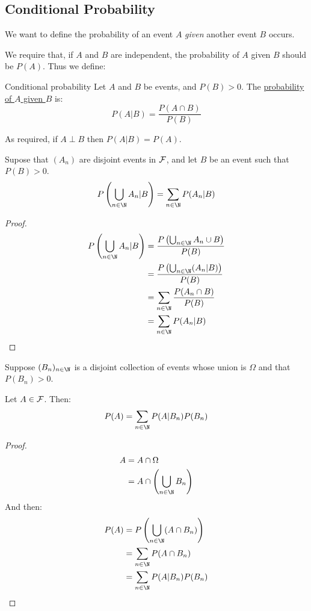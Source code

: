 \documentclass[../Main.tex]{subfiles}
\begin{document}
\subsection{Conditional Probability}
We want to define the probability of an event $A$ \textit{given} another event $B$ occurs.\par
We require that, if $A$ and $B$ are independent, the probability of $A$ given $B$ should be $P(A)$. Thus we define:
\begin{definition}{Conditional probability}
    Let $A$ and $B$ be events, and $P(B) > 0$. The \underline{probability of $A$ given $B$} is:
    \begin{equation*}
        P(A | B) = \frac{P(A \cap B)}{P(B)}
    \end{equation*}
\end{definition}
\begin{remark}
    As required, if $A \perp B$ then $P(A | B) = P(A)$.
\end{remark}
\begin{proposition}
    Supose that $(A_n)$ are disjoint events in $\mathcal{F}$, and let $B$ be an event such that $P(B) > 0$.
    \begin{equation*}
        P\left(\bigcup_{n \in \N} A_n | B\right) = \sum_{n \in \N} P(A_n | B)
    \end{equation*}
    \label{propConditionalDisjointProb}
\end{proposition}
\begin{proof}
    \begin{align*}
        P\left(\bigcup_{n \in \N} A_n | B\right) &= \frac{P\left(\bigcup_{n \in \N} A_n \cup B\right)}{P(B)} \\
        &= \frac{P\left(\bigcup_{n \in \N} (A_n | B)\right)}{P(B)} \\
        &= \sum_{n \in \N} \frac{P(A_n \cap B)}{P(B)} \\
        &= \sum_{n \in \N} P(A_n | B)
    \end{align*}
\end{proof}
\begin{theorem}
    Suppose $(B_n)_{n \in \N}$ is a disjoint collection of events whose union is $\Omega$ and that $P(B_n) > 0$.\par
    Let $A \in \mathcal{F}$. Then:
    \begin{equation*}
        P(A) = \sum_{n \in \N} P(A | B_n) P(B_n)
    \end{equation*}
    \label{thmTotalProbability}
\end{theorem}
\begin{proof}
    \begin{align*}
        A &= A \cap \Omega \\
        &= A \cap \left(\bigcup_{n \in \N}B_n\right)
    \end{align*}
    And then:
    \begin{align*}
        P(A) &= P\left(\bigcup_{n \in \N} (A \cap B_n) \right) \\
        &= \sum_{n \in \N}P(A \cap B_n) \\
        &= \sum_{n \in \N} P(A | B_n) P(B_n)
    \end{align*}
\end{proof}
\end{document}
